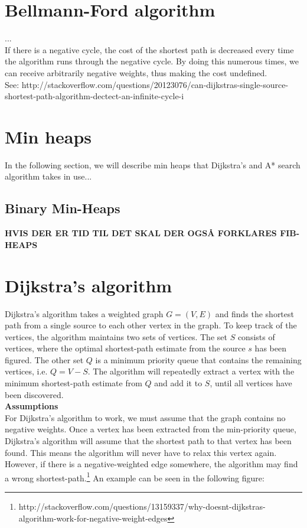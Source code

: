 \documentclass[11pt]{article}
\begin{document}
\section{Bellmann-Ford algorithm}
...\\
If there is a negative cycle, the cost of the shortest path is decreased every time the algorithm runs through the negative cycle. By doing this numerous times, we can receive arbitrarily negative weights, thus making the cost undefined.\\

See: http://stackoverflow.com/questions/20123076/can-dijkstras-single-source-shortest-path-algorithm-dectect-an-infinite-cycle-i\\


\section{Min heaps}
In the following section, we will describe min heaps that Dijkstra's  and A* search algorithm takes in use...\\
\subsection{Binary Min-Heaps}
\textbf{HVIS DER ER TID TIL DET SKAL DER OGSÅ FORKLARES FIB-HEAPS}

\section{Dijkstra's algorithm}
Dijkstra's algorithm takes a weighted graph $G = (V, E)$ and finds the shortest path from a single source to each other vertex in the graph. To keep track of the vertices, the algorithm maintains two sets of vertices. The set $S$ consists of vertices, where the optimal shortest-path estimate from the source $s$ has been figured. The other set $Q$ is a minimum priority queue that contains the remaining vertices, i.e. $Q = V - S$. The algorithm will repeatedly extract a vertex with the minimum shortest-path estimate from $Q$ and add it to $S$, until all vertices have been discovered.\\

\noindent 
\textbf{Assumptions}\\
For Dijkstra's algorithm to work, we must assume that the graph contains no negative weights. Once a vertex has been extracted from the min-priority queue, Dijkstra's algorithm will assume that the shortest path to that vertex has been found. This means the algorithm will never have to relax this vertex again. However, if there is a negative-weighted edge somewhere, the algorithm may find a wrong shortest-path.\footnote{http://stackoverflow.com/questions/13159337/why-doesnt-dijkstras-algorithm-work-for-negative-weight-edges} An example can be seen in the following figure:\\
\end{document}
